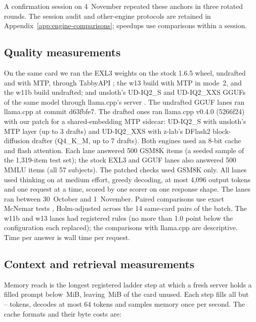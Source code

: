 \documentclass[11pt,letterpaper]{article}
\begin{document}
A confirmation session on 4~November repeated these anchors in three rotated
rounds. The session audit and other-engine protocols are retained in
Appendix~\ref{app:engine-comparisons}; speedups use comparisons within a session.


\subsection{Quality measurements}
\label{sec:qualitysetup}
On the same card we ran the EXL3 weights on the stock 1.6.5 wheel, undrafted
and with MTP, through TabbyAPI \citep{theroyallab2025tabbyapi}; the w13 build
with MTP in mode~2, and the w11b build undrafted; and unsloth's UD-IQ2\_S and
UD-IQ2\_XXS GGUFs of the same model \citep{unsloth2026qwen38gguf} through
llama.cpp's server \citep{gerganov2023llamacpp}. The undrafted GGUF lanes ran
llama.cpp at commit d63fbfe7. The drafted ones ran llama.cpp v0.4.0 (5266f24)
with our patch for a shared-embedding MTP sidecar: UD-IQ2\_S with unsloth's
MTP layer (up to 3 drafts) and UD-IQ2\_XXS with z-lab's DFlash2 block-diffusion
drafter \citep{chen2026dflash,zlab2026dflash2} (Q4\_K\_M, up to 7 drafts).
Both engines used an 8-bit cache and flash attention. Each lane answered 500
GSM8K items \citep{cobbe2021gsm8k} (a seeded sample of the 1,319-item test
set); the stock EXL3 and GGUF lanes also answered 500 MMLU items
\citep{hendrycks2021mmlu} (all 57 subjects). The patched checks used GSM8K
only. All lanes used
thinking on at medium effort, greedy decoding, at most 4,096 output tokens and
one request at a time, scored by one scorer on one response shape. The lanes
ran between 30~October and 1~November. Paired comparisons use exact McNemar
tests \citep{mcnemar1947}, Holm-adjusted \citep{holm1979} across the 14
same-card pairs of the batch. The w11b and w13 lanes had registered rules (no
more than 1.0 point below the configuration each replaced); the comparisons
with llama.cpp are descriptive. Time per answer is wall time per request.



\subsection{Context and retrieval measurements}
\label{sec:lcsetup}
Memory reach is the longest registered ladder step at which a fresh server
holds a filled prompt below \PeLimitMiB\,MiB, leaving \PeHeadroomMiB\,MiB
of the card unused. Each step fills all but \PeFillGapMin--\PeFillGapMax{}
tokens, decodes at most 64 tokens and samples memory once per second.
The cache formats and their byte costs are:
\end{document}
